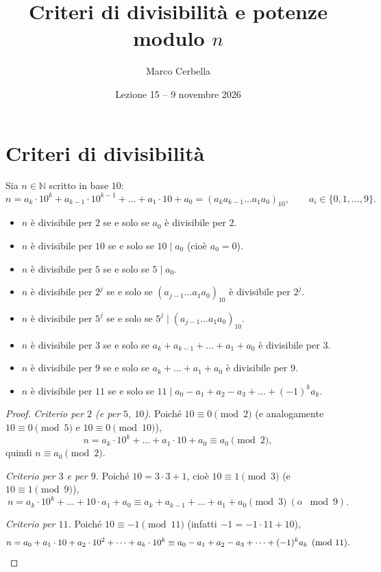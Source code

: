 \documentclass[11pt,a4paper]{article}
\title{Criteri di divisibilità e potenze modulo $n$}
\author{Marco Cerbella}
\date{Lezione 15 -- 9 novembre 2026}
\begin{document}
\maketitle

\section{Criteri di divisibilità}

Sia $n \in \mathbb{N}$ scritto in base $10$:
\[
  n = a_k\cdot 10^k + a_{k-1}\cdot 10^{k-1} + \dots + a_1\cdot 10 + a_0 = (a_k a_{k-1}\dots a_1 a_0)_{10}, \qquad a_i \in \{0, 1, \dots, 9\}.
\]

\begin{proposizione}
\begin{itemize}
  \item $n$ è divisibile per $2$ se e solo se $a_0$ è divisibile per $2$.
  \item $n$ è divisibile per $10$ se e solo se $10 \mid a_0$ (cioè $a_0 = 0$).
  \item $n$ è divisibile per $5$ se e solo se $5 \mid a_0$.
  \item $n$ è divisibile per $2^j$ se e solo se $(a_{j-1}\dots a_1 a_0)_{10}$ è divisibile per $2^j$.
  \item $n$ è divisibile per $5^j$ se e solo se $5^j \mid (a_{j-1}\dots a_1 a_0)_{10}$.
  \item $n$ è divisibile per $3$ se e solo se $a_k + a_{k-1} + \dots + a_1 + a_0$ è divisibile per $3$.
  \item $n$ è divisibile per $9$ se e solo se $a_k + \dots + a_1 + a_0$ è divisibile per $9$.
  \item $n$ è divisibile per $11$ se e solo se $11 \mid a_0 - a_1 + a_2 - a_3 + \dots + (-1)^k a_k$.
\end{itemize}
\end{proposizione}

\begin{proof}
\emph{Criterio per $2$ (e per $5$, $10$).} Poiché $10 \equiv 0 \pmod 2$ (e analogamente $10 \equiv 0 \pmod 5$ e $10 \equiv 0 \pmod{10}$),
\[
  n = a_k\cdot 10^k + \dots + a_1\cdot 10 + a_0 \equiv a_0 \pmod 2 ,
\]
quindi $n \equiv a_0 \pmod 2$.

\emph{Criterio per $3$ e per $9$.} Poiché $10 = 3\cdot 3 + 1$, cioè $10 \equiv 1 \pmod 3$ (e $10 \equiv 1 \pmod 9$),
\[
  n = a_k\cdot 10^k + \dots + 10\cdot a_1 + a_0 \equiv a_k + a_{k-1} + \dots + a_1 + a_0 \pmod 3 \ (\text{o } \bmod 9).
\]

\emph{Criterio per $11$.} Poiché $10 \equiv -1 \pmod{11}$ (infatti $-1 = -1\cdot 11 + 10$),
\[
  n = a_0 + a_1\cdot 10 + a_2\cdot 10^2 + \dots + a_k\cdot 10^k \equiv a_0 - a_1 + a_2 - a_3 + \dots + (-1)^k a_k \pmod{11}. \qedhere
\]
\end{proof}
\end{document}
